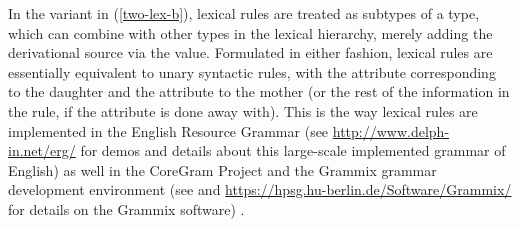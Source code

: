 \documentclass[output=paper
                ,modfonts
                ,nonflat
	        ,collection
	        ,collectionchapter
	        ,collectiontoclongg
 	        ,biblatex
                ,babelshorthands
                ,newtxmath
                ,draftmode
                ,colorlinks, citecolor=brown
]{./langsci/langscibook}
\begin{document}
{\begin{exe}
\ex \label{two-lex}
\begin{xlist}
\ex \label{two-lex-a}
\ex \label{two-lex-b}
\end{xlist}
\end{exe}



In the variant in (\ref{two-lex-b}), lexical rules are treated as subtypes of a   type, which can combine with other types in the lexical hierarchy, merely adding the derivational source via the  value. 
Formulated in either fashion, lexical rules are essentially equivalent to unary syntactic rules, with the  attribute corresponding to the daughter and the  attribute to the mother (or the rest of the information in the rule, if the  attribute is done away with). This is the way lexical rules are implemented in the English Resource Grammar (see \url{http://www.delph-in.net/erg/} for demos and details about this large-scale implemented grammar of English) as well in the CoreGram Project and the Grammix grammar development environment  (see \citealt{Mueller2007b} and \url{https://hpsg.hu-berlin.de/Software/Grammix/} for details on the Grammix software) .

}
\end{document}
